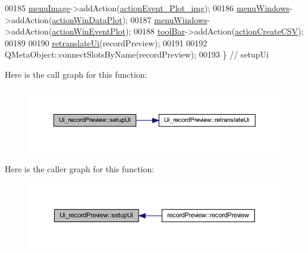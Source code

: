 \begin{DoxyCode}
00185         \hyperlink{a00028_af1ff1ecbe6ea007cfeda320cca9865b7}{menuImage}->addAction(\hyperlink{a00028_a789f5466c7f1781c13d4d027e982ca55}{actionEvent\_Plot\_img});
00186         \hyperlink{a00028_afd93511da273fc2c6a88472d154cb176}{menuWindows}->addAction(\hyperlink{a00028_aa09067a9c96c9cd78f75261a9fcb89f0}{actionWinDataPlot});
00187         \hyperlink{a00028_afd93511da273fc2c6a88472d154cb176}{menuWindows}->addAction(\hyperlink{a00028_ac72ec9c8679d46fd43a87f99ee6db893}{actionWinEventPlot});
00188         \hyperlink{a00028_ac94509c2cd16337592e1634b0f2a6020}{toolBar}->addAction(\hyperlink{a00028_ae81b7303db9e9c5d730c59b86ec0e960}{actionCreateCSV});
00189 
00190         \hyperlink{a00028_ad30b831cfb4b32956fe67a79748ba194}{retranslateUi}(recordPreview);
00191 
00192         QMetaObject::connectSlotsByName(recordPreview);
00193     \} \textcolor{comment}{// setupUi}
\end{DoxyCode}


Here is the call graph for this function\+:
\nopagebreak
\begin{figure}[H]
\begin{center}
\leavevmode
\includegraphics[width=350pt]{dc/d3c/a00028_afa41dc070a896a5eae476f3c0206825c_cgraph}
\end{center}
\end{figure}




Here is the caller graph for this function\+:
\nopagebreak
\begin{figure}[H]
\begin{center}
\leavevmode
\includegraphics[width=350pt]{dc/d3c/a00028_afa41dc070a896a5eae476f3c0206825c_icgraph}
\end{center}
\end{figure}




